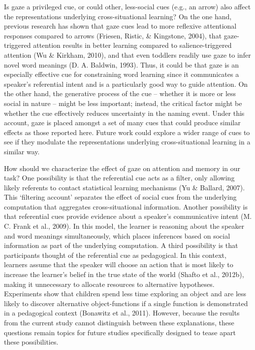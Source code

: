 \documentclass[oneside]{report}
\begin{document}
Is gaze a privileged cue, or could other, less-social cues (e.g., an
arrow) also affect the representations underlying cross-situational
learning? On the one hand, previous research has shown that gaze cues
lead to more reflexive attentional responses compared to arrows
(Friesen, Ristic, \& Kingstone, 2004), that gaze-triggered attention
results in better learning compared to salience-triggered attention (Wu
\& Kirkham, 2010), and that even toddlers readily use gaze to infer
novel word meanings (D. A. Baldwin, 1993). Thus, it could be that gaze
is an especially effective cue for constraining word learning since it
communicates a speaker's referential intent and is a particularly good
way to guide attention. On the other hand, the generative process of the
cue -- whether it is more or less social in nature -- might be less
important; instead, the critical factor might be whether the cue
effectively reduces uncertainty in the naming event. Under this account,
gaze is placed amongst a set of many cues that could produce similar
effects as those reported here. Future work could explore a wider range
of cues to see if they modulate the representations underlying
cross-situational learning in a similar way.

How should we characterize the effect of gaze on attention and memory in
our task? One possibility is that the referential cue acts as a filter,
only allowing likely referents to contact statistical learning
mechanisms (Yu \& Ballard, 2007). This `filtering account' separates the
effect of social cues from the underlying computation that aggregates
cross-situational information. Another possibility is that referential
cues provide evidence about a speaker's communicative intent (M. C.
Frank et al., 2009). In this model, the learner is reasoning about the
speaker and word meanings simultaneously, which places inferences based
on social information as part of the underlying computation. A third
possibility is that participants thought of the referential cue as
pedagogical. In this context, learners assume that the speaker will
choose an action that is most likely to increase the learner's belief in
the true state of the world (Shafto et al., 2012b), making it
unnecessary to allocate resources to alternative hypotheses. Experiments
show that children spend less time exploring an object and are less
likely to discover alternative object-functions if a single function is
demonstrated in a pedagogical context (Bonawitz et al., 2011). However,
because the results from the current study cannot distinguish between
these explanations, these questions remain topics for future studies
specifically designed to tease apart these possibilities.
\end{document}
